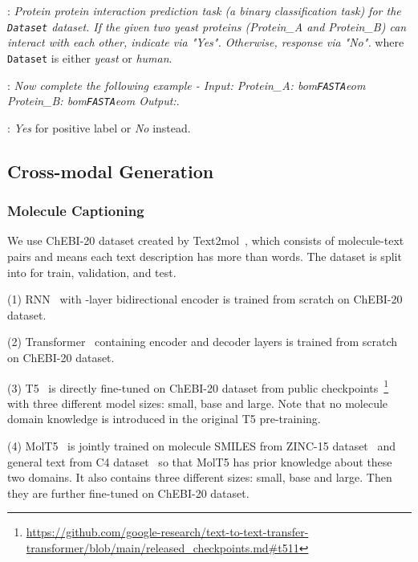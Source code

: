 \documentclass[11pt]{article}
\newcommand{\bop}{bom}
\newcommand{\eop}{eom}
\newcommand{\dataset}{\texttt{Dataset}}
\newcommand{\fasta}{\texttt{FASTA}}
\begin{document}

:
\textit{Protein protein interaction prediction task (a binary classification task) for the \dataset{} dataset. If the given two yeast proteins (Protein\_A and Protein\_B) can interact with each other, indicate via "Yes". Otherwise, response via "No".} where \dataset{} is either \textit{yeast} or \textit{human}.

:
\textit{Now complete the following example - Input: Protein\_A: \bop{}\fasta{}\eop{} Protein\_B: \bop{}\fasta{}\eop{} Output:}.

:
\textit{Yes} for positive label or \textit{No} instead.


\subsection{Cross-modal Generation}
\subsubsection{Molecule Captioning}
\label{sec:mol2text_detail}

\noindent We use ChEBI-20 dataset created by Text2mol~\citep{DBLP:conf/emnlp/EdwardsZJ21}, which consists of  molecule-text pairs and  means each text description has more than  words.
The dataset is split into  for train, validation, and test.


\noindent(1) RNN~\citep{medsker2001recurrent} with -layer bidirectional encoder is trained from scratch on ChEBI-20 dataset.

\noindent(2) Transformer~\citep{vaswani2017attention} containing  encoder and decoder layers is trained from scratch on ChEBI-20 dataset.

\noindent(3) T5~\citep{raffel2020exploring} is directly fine-tuned on ChEBI-20 dataset from public checkpoints~\footnote{\url{https://github.com/google-research/text-to-text-transfer-transformer/blob/main/released_checkpoints.md\#t511}} with three different model sizes: small, base and large. Note that no molecule domain knowledge is introduced in the original T5 pre-training.

\noindent(4) MolT5~\citep{DBLP:conf/emnlp/EdwardsLRHCJ22} is jointly trained on molecule SMILES from ZINC-15 dataset~\citep{DBLP:journals/jcisd/SterlingI15} and general text from C4 dataset~\citep{raffel2020exploring} so that MolT5 has prior knowledge about these two domains. It also contains three different sizes: small, base and large. Then they are further fine-tuned on ChEBI-20 dataset.
\end{document}
